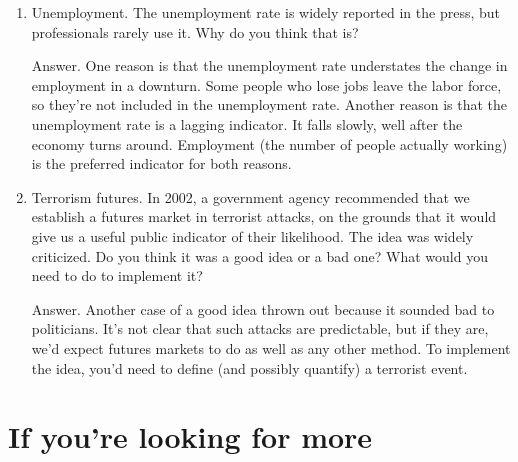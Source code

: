 \begin{enumerate}
\item Unemployment.  The unemployment rate is widely reported in the press,
but professionals rarely use it.  Why do you think that is?

Answer.
One reason is that the unemployment rate understates the
change in employment in a downturn.
Some people who lose jobs leave the labor force,
so they're not included in the unemployment rate.
Another reason is that the unemployment rate is a lagging
indicator.
It falls slowly, well after the economy turns around.
Employment (the number of people actually working) is
the preferred indicator for both reasons.

%

\item Terrorism futures.
In 2002, a government agency recommended that we establish a
futures market in terrorist attacks, on the grounds that it would
give us a useful public indicator of their likelihood.  The idea
was widely criticized.  Do you think it was a good idea or a bad
one?  What would you need to do to implement it?

Answer.  Another case of a good idea thrown out because it sounded
bad to politicians.  It's not clear that such attacks are predictable,
but if they are, we'd expect futures markets to do as well as any
other method.  To implement the idea, you'd need to define (and
possibly quantify) a terrorist event.
\end{enumerate}


\section*{If you're looking for more}


